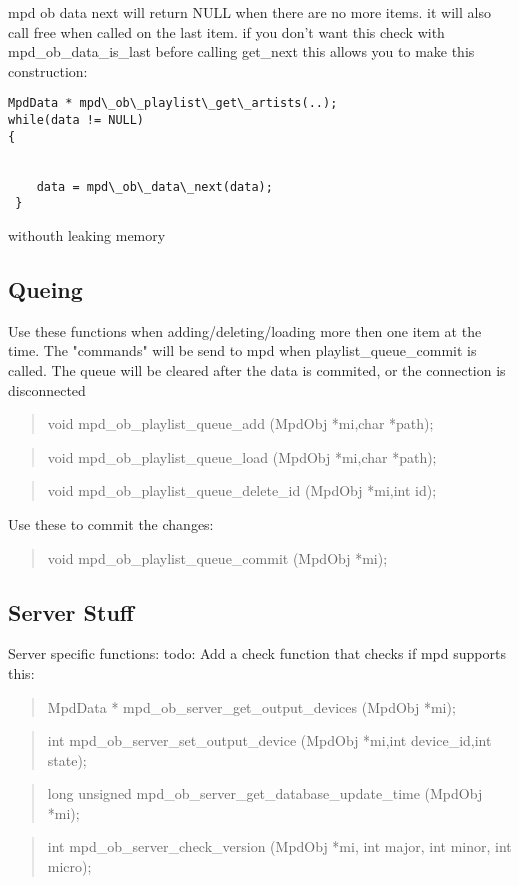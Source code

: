 \documentclass[a4paper,11pt]{article}
\begin{document}
mpd ob data next will return NULL when there are no more items. it will also call free when called on the last item.
if you don't want this check with mpd\_ob\_data\_is\_last before calling get\_next
this allows you to make this construction:

\begin{verbatim}
MpdData * mpd\_ob\_playlist\_get\_artists(..);
while(data != NULL)
{


	data = mpd\_ob\_data\_next(data);
 }
\end{verbatim}

withouth leaking memory 


\subsection{Queing}


Use these functions when adding/deleting/loading more then one item at the time.
The "commands" will be send to mpd when playlist\_queue\_commit is called.
The queue will be cleared after the data is commited, or the connection is disconnected

\begin{quote}
void 		mpd\_ob\_playlist\_queue\_add		(MpdObj *mi,char *path);
\end{quote}

\begin{quote}
void 		mpd\_ob\_playlist\_queue\_load		(MpdObj *mi,char *path);
\end{quote}
\begin{quote}
void 		mpd\_ob\_playlist\_queue\_delete\_id		(MpdObj *mi,int id);
\end{quote}

Use these to commit the changes:
\begin{quote}
void 		mpd\_ob\_playlist\_queue\_commit		(MpdObj *mi);
\end{quote}

\subsection{Server Stuff}

Server specific functions:
todo: Add a check function that checks if mpd supports this:
\begin{quote}
MpdData * 	mpd\_ob\_server\_get\_output\_devices	(MpdObj *mi);
\end{quote}

\begin{quote}
int 		mpd\_ob\_server\_set\_output\_device		(MpdObj *mi,int device\_id,int state);
\end{quote}
\begin{quote}
long unsigned	mpd\_ob\_server\_get\_database\_update\_time	(MpdObj *mi);
\end{quote}
\begin{quote}
int 		mpd\_ob\_server\_check\_version		(MpdObj *mi, int major, int minor, int micro);
\end{quote}
\end{document}
